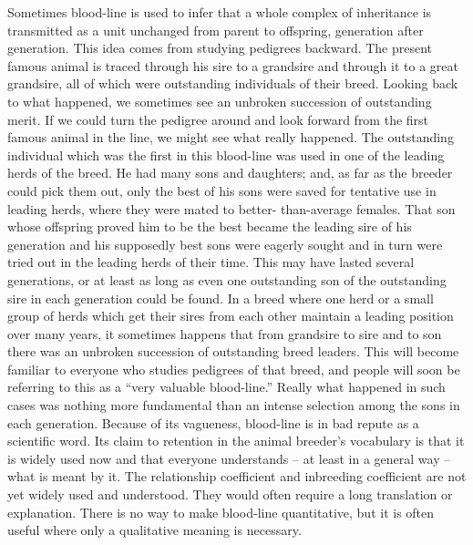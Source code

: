 Sometimes blood-line is used to infer that a whole complex of inheritance
is transmitted as a unit unchanged from parent to offspring,
generation after generation. This idea comes from studying pedigrees
backward. The present famous animal is traced through his sire to a
grandsire and through it to a great grandsire, all of which were outstanding
individuals of their breed. Looking back to what happened,
we sometimes see an unbroken succession of outstanding merit. If we
could turn the pedigree around and look forward from the first famous
animal in the line, we might see what really happened. The outstanding
individual which was the first in this blood-line was used in one of
the leading herds of the breed. He had many sons and daughters; and,
as far as the breeder could pick them out, only the best of his sons were
saved for tentative use in leading herds, where they were mated to better-
than-average females. That son whose offspring proved him to be
the best became the leading sire of his generation and his supposedly
best sons were eagerly sought and in turn were tried out in the leading
herds of their time. This may have lasted several generations, or at least
as long as even one outstanding son of the outstanding sire in each generation
could be found. In a breed where one herd or a small group of
herds which get their sires from each other maintain a leading position
over many years, it sometimes happens that from grandsire to sire
and to son there was an unbroken succession of outstanding breed
leaders. This will become familiar to everyone who studies pedigrees of
that breed, and people will soon be referring to this as a ``very valuable
blood-line.'' Really what happened in such cases was nothing more fundamental
than an intense selection among the sons in each generation.
Because of its vagueness, blood-line is in bad repute as a scientific
word. Its claim to retention in the animal breeder's vocabulary is that it
is widely used now and that everyone understands -- at least in a general
way -- what is meant by it. The relationship coefficient and inbreeding
coefficient are not yet widely used and understood. They would
often require a long translation or explanation. There is no way to
make blood-line quantitative, but it is often useful where only a qualitative
meaning is necessary.

